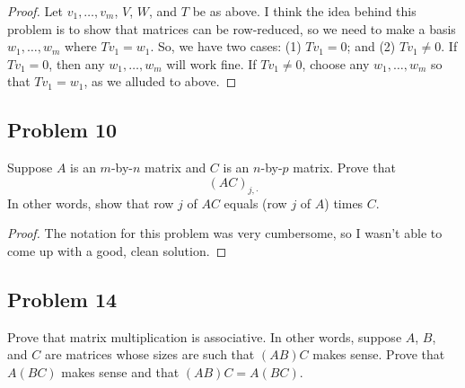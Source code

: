 \documentclass[letterpaper, 12pt]{amsart}
\theoremstyle{definition}  							%
\begin{document}
		\begin{proof}
		Let $v_{1}, \dots, v_{m}$, $V$, $W$, and $T$ be as above.
		I think the idea behind this problem is to show that matrices can be row-reduced, so we need to make a basis $w_{1}, \dots, w_{m}$ where $Tv_{1} = w_{1}$.
		So, we have two cases: (1) $Tv_{1} = 0$; and (2) $Tv_{1} \neq 0$.
		If $Tv_{1} = 0$, then any $w_{1}, \dots, w_{m}$ will work fine.
		If $Tv_{1} \neq 0$, choose any $w_{1}, \dots, w_{m}$ so that $Tv_{1} = w_{1}$, as we alluded to above.
		\end{proof}

		\subsection*{Problem 10}
		Suppose $A$ is an $m$-by-$n$ matrix and $C$ is an $n$-by-$p$ matrix. 
		Prove that $$(AC)_{j,\cdot}$$
		In other words, show that row $j$ of $AC$ equals (row $j$ of $A$) times $C$.

		\begin{proof}
		The notation for this problem was very cumbersome, so I wasn't able to come up with a good, clean solution.
		\end{proof}

		\subsection*{Problem 14}
		Prove that matrix multiplication is associative. 
		In other words, suppose $A$, $B$, and $C$ are matrices whose sizes are such that $(AB)C$ makes sense. Prove that $A(BC)$ makes sense and that $(AB)C = A(BC)$.
\end{document}

